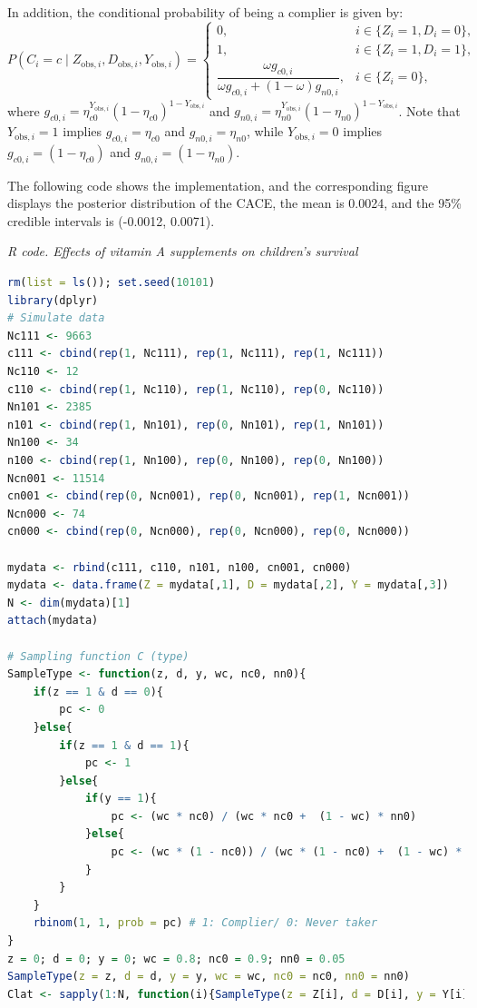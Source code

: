 In addition, the conditional probability of being a complier is given by:
\[
P(C_i = c \mid Z_{\text{obs},i}, D_{\text{obs},i}, Y_{\text{obs},i}) =
\begin{cases}
	0, & i \in \{Z_i = 1, D_i = 0\},\\
	1, & i \in \{Z_i = 1, D_i = 1\},\\
	\dfrac{\omega g_{c0,i}}{\omega g_{c0,i} + (1-\omega) g_{n0,i}}, & i \in \{Z_i = 0\},
\end{cases}
\]
where $g_{c0,i} = \eta_{c0}^{Y_{\text{obs},i}} (1 - \eta_{c0})^{1 - Y_{\text{obs},i}}$ and $g_{n0,i} = \eta_{n0}^{Y_{\text{obs},i}} (1 - \eta_{n0})^{1 - Y_{\text{obs},i}}$. Note that $Y_{\text{obs},i} = 1$ implies $g_{c0,i} = \eta_{c0}$ and $g_{n0,i} = \eta_{n0}$, while $Y_{\text{obs},i} = 0$ implies $g_{c0,i} = (1 - \eta_{c0})$ and $g_{n0,i} = (1 - \eta_{n0})$.

The following code shows the implementation, and the corresponding figure displays the posterior distribution of the CACE, the mean is 0.0024, and the 95\% credible intervals is (-0.0012, 0.0071).

\begin{tcolorbox}[enhanced,width=4.67in,center upper,
	fontupper=\large\bfseries,drop shadow southwest,sharp corners]\label{codea_chap12}
	\textit{R code. Effects of vitamin A supplements on children's survival}
	\begin{VF}
		\begin{lstlisting}[language=R]
rm(list = ls()); set.seed(10101)
library(dplyr)
# Simulate data
Nc111 <- 9663
c111 <- cbind(rep(1, Nc111), rep(1, Nc111), rep(1, Nc111)) 
Nc110 <- 12
c110 <- cbind(rep(1, Nc110), rep(1, Nc110), rep(0, Nc110)) 
Nn101 <- 2385
n101 <- cbind(rep(1, Nn101), rep(0, Nn101), rep(1, Nn101)) 
Nn100 <- 34
n100 <- cbind(rep(1, Nn100), rep(0, Nn100), rep(0, Nn100)) 
Ncn001 <- 11514
cn001 <- cbind(rep(0, Ncn001), rep(0, Ncn001), rep(1, Ncn001)) 
Ncn000 <- 74
cn000 <- cbind(rep(0, Ncn000), rep(0, Ncn000), rep(0, Ncn000)) 

mydata <- rbind(c111, c110, n101, n100, cn001, cn000)
mydata <- data.frame(Z = mydata[,1], D = mydata[,2], Y = mydata[,3])
N <- dim(mydata)[1]
attach(mydata)

# Sampling function C (type)
SampleType <- function(z, d, y, wc, nc0, nn0){
	if(z == 1 & d == 0){
		pc <- 0
	}else{
		if(z == 1 & d == 1){
			pc <- 1
		}else{
			if(y == 1){
				pc <- (wc * nc0) / (wc * nc0 +  (1 - wc) * nn0)
			}else{
				pc <- (wc * (1 - nc0)) / (wc * (1 - nc0) +  (1 - wc) * (1 - nn0))
			}
		}
	}
	rbinom(1, 1, prob = pc) # 1: Complier/ 0: Never taker
}
z = 0; d = 0; y = 0; wc = 0.8; nc0 = 0.9; nn0 = 0.05
SampleType(z = z, d = d, y = y, wc = wc, nc0 = nc0, nn0 = nn0)
Clat <- sapply(1:N, function(i){SampleType(z = Z[i], d = D[i], y = Y[i], wc = wc, nc0 = nc0, nn0 = nn0)})
\end{lstlisting}
	\end{VF}
\end{tcolorbox} 



